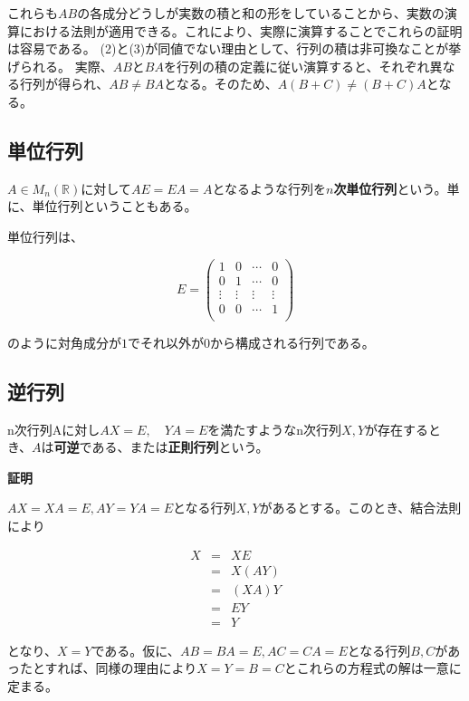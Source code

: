 \documentclass[dvipdfmx,autodetect-engine]{jsarticle}
\begin{document}
これらも$AB$の各成分どうしが実数の積と和の形をしていることから、実数の演算における法則が適用できる。これにより、実際に演算することでこれらの証明は容易である。
(2)と(3)が同値でない理由として、行列の積は非可換なことが挙げられる。
実際、$AB$と$BA$を行列の積の定義に従い演算すると、それぞれ異なる行列が得られ、$AB \neq BA$となる。そのため、$A(B+C) \neq (B+C)A$となる。

\subsection{単位行列}


$A \in M_n(\mathbb{R})$に対して$AE = EA = A$となるような行列を{\bf $n$次単位行列}という。単に、単位行列ということもある。

単位行列は、

$$
E = \begin{pmatrix}
1 & 0 & \cdots & 0 \\
0 & 1 & \cdots & 0 \\
\vdots & \vdots & \vdots & \vdots \\
0 & 0 & \cdots & 1 \\
\end{pmatrix}
$$

のように対角成分が$1$でそれ以外が$0$から構成される行列である。


\subsection{逆行列}

n次行列Aに対し$AX = E, \quad YA = E$を満たすようなn次行列$X, Y$が存在するとき、$A$は{\bf 可逆}である、または{\bf 正則行列}という。


{\bf 証明}

$AX = XA = E, AY = YA = E$となる行列$X, Y$があるとする。このとき、結合法則により

\begin{eqnarray*}
X &= &XE \\
  &= &X(AY) \\
  &= &(XA)Y \\
  &= &EY \\
  &= &Y
\end{eqnarray*}

となり、$X = Y$である。仮に、$AB = BA = E, AC = CA = E$となる行列$B, C$があったとすれば、同様の理由により$X = Y = B = C$とこれらの方程式の解は一意に定まる。
\end{document}
